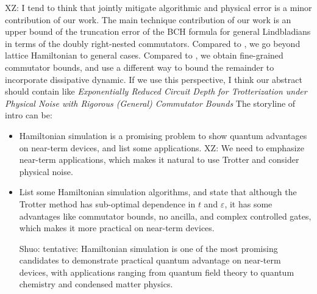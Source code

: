 \documentclass[11pt]{article}
\newcommand{\eps}{\varepsilon}
\newcommand{\xz}[1]{{\color{cyan} XZ: #1}}
\newcommand{\sz}[1]{{\color{blue} Shuo: #1}}
\begin{document}
\xz{I tend to think that jointly mitigate algorithmic and physical error is a minor contribution of our work. The main technique contribution of our work is an upper bound of the truncation error of the BCH formula for general Lindbladians in terms of the doubly right-nested commutators. Compared to \cite{mizuta2025commutator}, we go beyond lattice Hamiltonian to general cases. Compared to \cite{fang2025high}, we obtain fine-grained commutator bounds, and use a different way to bound the remainder to incorporate dissipative dynamic.} 
If we use this perspective, I think our abstract should contain like \emph{Exponentially Reduced Circuit Depth for Trotterization under Physical Noise with Rigorous (General) Commutator Bounds}
The storyline of intro can be:
\begin{itemize}
    \item Hamiltonian simulation is a promising problem to show quantum advantages on near-term devices, and list some applications. \xz{We need to emphasize near-term applications, which makes it natural to use Trotter and consider physical noise. }
    \item List some Hamiltonian simulation algorithms, and state that although the Trotter method has sub-optimal dependence in $t$ and $\eps$, it has some advantages like commutator bounds, no ancilla, and complex controlled gates, which makes it more practical on near-term devices. \\
    \sz{tentative: Hamiltonian simulation is one of the most promising candidates to demonstrate practical quantum advantage on near-term devices, with applications ranging from quantum field theory to quantum chemistry and condensed matter physics.

}
\end{itemize}
\end{document}
